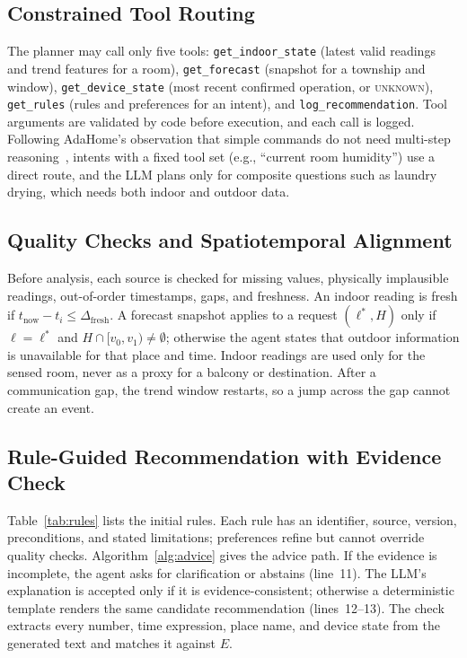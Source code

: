 \subsection{Constrained Tool Routing}
{\sloppy
The planner may call only five tools: \texttt{get\_indoor\_state} (latest valid readings and trend features for a room), \texttt{get\_forecast} (snapshot for a township and window), \texttt{get\_device\_state} (most recent confirmed operation, or \textsc{unknown}), \texttt{get\_rules} (rules and preferences for an intent), and \texttt{log\_recommendation}. Tool arguments are validated by code before execution, and each call is logged. Following AdaHome's observation that simple commands do not need multi-step reasoning~\cite{lim2026adahome}, intents with a fixed tool set (e.g., ``current room humidity'') use a direct route, and the LLM plans only for composite questions such as laundry drying, which needs both indoor and outdoor data.\par}

\subsection{Quality Checks and Spatiotemporal Alignment}
Before analysis, each source is checked for missing values, physically implausible readings, out-of-order timestamps, gaps, and freshness. An indoor reading is fresh if $t_{\mathrm{now}}-t_i\le\Delta_{\mathrm{fresh}}$. A forecast snapshot applies to a request $(\ell^\ast, H)$ only if $\ell=\ell^\ast$ and $H\cap[v_0,v_1)\neq\emptyset$; otherwise the agent states that outdoor information is unavailable for that place and time. Indoor readings are used only for the sensed room, never as a proxy for a balcony or destination. After a communication gap, the trend window restarts, so a jump across the gap cannot create an event.

\subsection{Rule-Guided Recommendation with Evidence Check}
Table~\ref{tab:rules} lists the initial rules. Each rule has an identifier, source, version, preconditions, and stated limitations; preferences refine but cannot override quality checks. Algorithm~\ref{alg:advice} gives the advice path. If the evidence is incomplete, the agent asks for clarification or abstains (line~11). The LLM's explanation is accepted only if it is evidence-consistent; otherwise a deterministic template renders the same candidate recommendation (lines~12--13). The check extracts every number, time expression, place name, and device state from the generated text and matches it against $E$.

